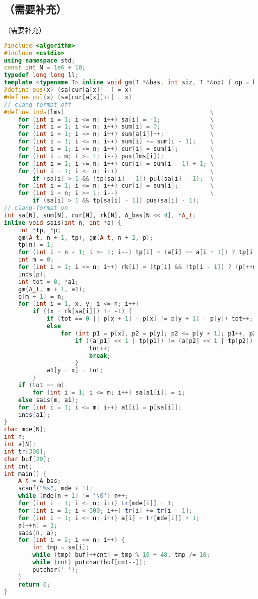 \documentclass[9pt, a4paper, oneside]{book}
\begin{document}
\subsection{（需要补充）}
（需要补充）
\begin{lstlisting}[language={C++}]
#include <algorithm>
#include <cstdio>
using namespace std;
const int N = 1e6 + 10;
typedef long long ll;
template <typename T> inline void gm(T *&bas, int siz, T *&op) { op = bas, bas += siz; }
#define pus(x) (sa[cur[a[x]]--] = x)
#define pul(x) (sa[cur[a[x]]++] = x)
// clang-format off
#define inds(lms)                                         \
    for (int i = 1; i <= n; i++) sa[i] = -1;              \
    for (int i = 1; i <= n; i++) sum[i] = 0;              \
    for (int i = 1; i <= n; i++) sum[a[i]]++;             \
    for (int i = 1; i <= n; i++) sum[i] += sum[i - 1];    \
    for (int i = 1; i <= n; i++) cur[i] = sum[i];         \
    for (int i = m; i >= 1; i--) pus(lms[i]);             \
    for (int i = 1; i <= n; i++) cur[i] = sum[i - 1] + 1; \
    for (int i = 1; i <= n; i++)                          \
        if (sa[i] > 1 && !tp[sa[i] - 1]) pul(sa[i] - 1);  \
    for (int i = 1; i <= n; i++) cur[i] = sum[i];         \
    for (int i = n; i >= 1; i--)                          \
        if (sa[i] > 1 && tp[sa[i] - 1]) pus(sa[i] - 1);
// clang-format on
int sa[N], sum[N], cur[N], rk[N], A_bas[N << 4], *A_t;
inline void sais(int n, int *a) {
    int *tp, *p;
    gm(A_t, n + 1, tp), gm(A_t, n + 2, p);
    tp[n] = 1;
    for (int i = n - 1; i >= 1; i--) tp[i] = (a[i] == a[i + 1]) ? tp[i + 1] : (a[i] < a[i + 1]);
    int m = 0;
    for (int i = 1; i <= n; i++) rk[i] = (tp[i] && !tp[i - 1]) ? (p[++m] = i, m) : -1;
    inds(p);
    int tot = 0, *a1;
    gm(A_t, m + 1, a1);
    p[m + 1] = n;
    for (int i = 1, x, y; i <= n; i++)
        if ((x = rk[sa[i]]) != -1) {
            if (tot == 0 || p[x + 1] - p[x] != p[y + 1] - p[y]) tot++;
            else
                for (int p1 = p[x], p2 = p[y]; p2 <= p[y + 1]; p1++, p2++)
                    if ((a[p1] << 1 | tp[p1]) != (a[p2] << 1 | tp[p2])) {
                        tot++;
                        break;
                    }
            a1[y = x] = tot;
        }
    if (tot == m)
        for (int i = 1; i <= m; i++) sa[a1[i]] = i;
    else sais(m, a1);
    for (int i = 1; i <= m; i++) a1[i] = p[sa[i]];
    inds(a1);
}
char mde[N];
int n;
int a[N];
int tr[300];
char buf[20];
int cnt;
int main() {
    A_t = A_bas;
    scanf("%s", mde + 1);
    while (mde[n + 1] != '\0') n++;
    for (int i = 1; i <= n; i++) tr[mde[i]] = 1;
    for (int i = 1; i < 300; i++) tr[i] += tr[i - 1];
    for (int i = 1; i <= n; i++) a[i] = tr[mde[i]] + 1;
    a[++n] = 1;
    sais(n, a);
    for (int i = 2; i <= n; i++) {
        int tmp = sa[i];
        while (tmp) buf[++cnt] = tmp % 10 + 48, tmp /= 10;
        while (cnt) putchar(buf[cnt--]);
        putchar(' ');
    }
    return 0;
}\end{lstlisting}
\end{document}
